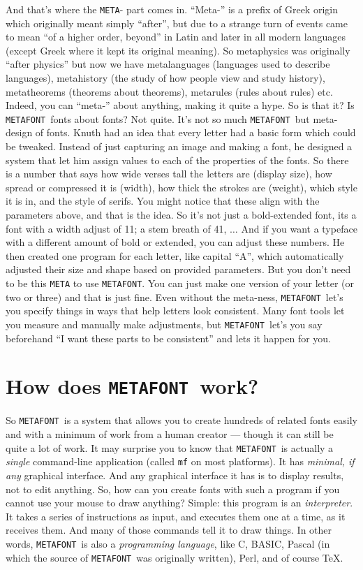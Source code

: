 \documentclass[a4paper,11pt,twoside]{book}
\newcommand{\MF}{{\tt METAFONT}}
\begin{document}
And that's where the \texttt{META}- part comes in. ``Meta-'' is a prefix of Greek origin which
originally meant simply ``after'', but due to a strange turn of events came to mean ``of a higher
order, beyond'' in Latin and later in all modern languages (except Greek where it kept its
original meaning).
So metaphysics was originally ``after physics'' but now we have metalanguages (languages used
to describe languages), metahistory (the study of how people view and study history), metatheorems
(theorems about theorems), metarules (rules about rules) etc.
Indeed, you can ``meta-'' about anything, making it quite a hype.
So is that it?
Is \MF\ fonts about fonts?
Not quite.
It's not so much \MF\ but meta-design of fonts.
Knuth had an idea that every letter had a basic form which could be tweaked.
Instead of just capturing an image and making a font, he designed a system that let him assign
values to each of the properties of the fonts.
So there is a number that says how wide verses tall the letters are (display size), how spread or
compressed it is (width), how thick the strokes are (weight), which style it is in, and the style
of serifs.
You might notice that these align with the parameters above, and that is the idea.
So it's not just a bold-extended font, its a font with a width adjust of 11; a stem breath of 41,
$\ldots$
And if you want a typeface with a different amount of bold or extended, you can adjust these
numbers.
He then created one program for each letter, like capital ``A'', which automatically adjusted
their size and shape based on provided parameters.
But you don't need to be this \texttt{META} to use \MF.
You can just make one version of your letter (or two or three) and that is just fine.
Even without the meta-ness, \MF\ let's you specify things in ways that help letters look
consistent.
Many font tools let you measure and manually make adjustments, but \MF\ let's you say beforehand
``I want these parts to be consistent'' and lets it happen for you.

\section{How does \MF\ work?}

So \MF\ is a system that allows you to create hundreds of related fonts easily and with a minimum
of work from a human creator --- though it can still be quite a lot of work.
It may surprise you to know that \MF\ is actually a \emph{single} command-line application
(called \texttt{mf} on most platforms).
It has \emph{minimal, if any} graphical interface.
And any graphical interface it has is to display results, not to edit anything.
So, how can you create fonts with such a program if you cannot use your mouse to draw anything?
Simple: this program is an \emph{interpreter}.
It takes a series of instructions as input, and executes them one at a time, as it receives them.
And many of those commands tell it to draw things.
In other words, \MF\ is also a \emph{programming language}, like C, BASIC, Pascal (in which the
source of \MF\ was originally written), Perl, and of course \TeX.
\end{document}
